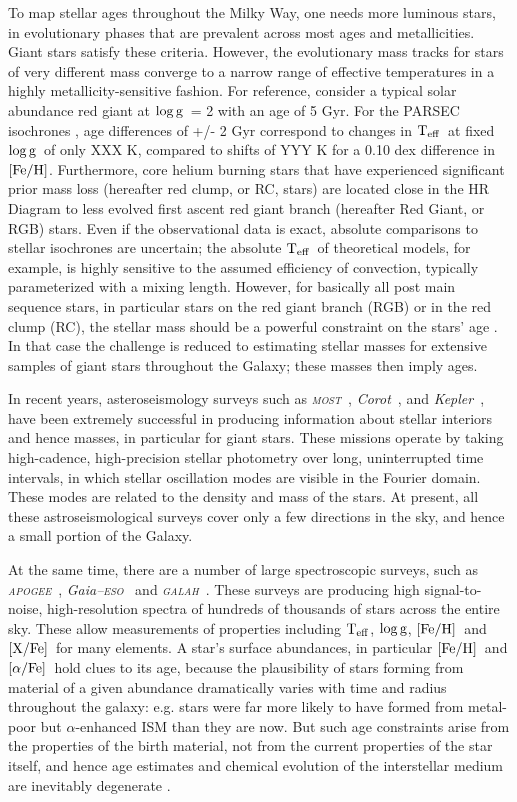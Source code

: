 \documentclass[12pt, preprint]{aastex}
\newcommand{\project}[1]{\textsl{#1}}
\newcommand{\apogee}{\project{\textsc{apogee}}}
\newcommand{\corot}{\project{Corot}}
\newcommand{\kepler}{\project{Kepler}}
\newcommand{\gaiaeso}{\project{Gaia--\textsc{eso}}}
\newcommand{\galah}{\project{\textsc{galah}}}
\newcommand{\most}{\project{\textsc{most}}}
\newcommand{\teff}{\mbox{$\rm T_{eff}$}}
\newcommand{\feh}{\mbox{$\rm [Fe/H]$}}
\newcommand{\xfe}{\mbox{$\rm [X/Fe]$}}
\newcommand{\alphafe}{\mbox{$\rm [\alpha/Fe]$}}
\newcommand{\logg}{\mbox{$\rm \log g$}}
\begin{document}
To map stellar ages throughout the Milky Way, one needs more luminous stars, in evolutionary phases that are prevalent across most ages and metallicities. Giant stars satisfy these criteria. However, the evolutionary mass tracks for stars of very different mass converge to a narrow range of effective temperatures in a highly metallicity-sensitive fashion.  For reference, consider a typical solar abundance red giant at \logg\ = 2 with an age of 5 Gyr.  For the PARSEC isochrones   \citep{Bressan2012}, age differences of +/- 2 Gyr correspond to changes in \teff\ at fixed \logg\ of only XXX K, compared to shifts of YYY K for a 0.10 dex difference in \feh.  Furthermore, core helium burning stars that have experienced significant prior mass loss (hereafter red clump, or RC, stars) are located close in the HR Diagram to less evolved first ascent red giant branch (hereafter Red Giant, or RGB) stars.  Even if the observational data is exact, absolute comparisons to stellar isochrones are uncertain; the absolute \teff\ of theoretical models, for example, is highly sensitive to the assumed efficiency of convection, typically parameterized with a mixing length.  However, for basically all post main sequence stars, in particular stars on the red giant branch (RGB) or in the red clump (RC), the stellar mass should be a powerful constraint on the stars' age \citep[see e.g.][]{Martig2014}. In that case the challenge is reduced to estimating stellar masses for extensive samples of giant stars throughout the Galaxy; these masses then imply ages.


In recent years, asteroseismology surveys such as \most\ \citep{most2005}, \corot\ \citep{corot2009}, and \kepler\ \citep{Bedding2010}, have
been extremely successful in producing information
about stellar interiors and hence masses, in particular for giant stars. 
These missions operate by taking high-cadence, high-precision stellar
photometry over long, uninterrupted time intervals, in which stellar oscillation 
modes are visible in the Fourier domain. These modes are related to the density and mass of the stars.
At present, all these astroseismological surveys cover only a few directions in the sky, and hence a small portion of the Galaxy.

At the same time, there are a number of large spectroscopic surveys, such
as \apogee\ \citep{Majewski2012}, \gaiaeso\ \citep{Gilmore2012} and \galah\ \citep{Freeman2012}. These surveys are 
producing high signal-to-noise, high-resolution spectra
of hundreds of thousands of stars across the entire sky. These allow measurements of properties including \teff, \logg, \feh\ and \xfe\ for many elements. A star's surface abundances, in particular \feh\ and \alphafe\ hold clues to its age, because the plausibility of stars forming from material of a given abundance dramatically varies with time and radius throughout the galaxy: e.g. stars 
were far more likely to have formed from metal-poor but $\alpha$-enhanced ISM than they are now. But such age constraints arise from the properties of the birth material, not from the current properties of the star itself, and hence age estimates and chemical evolution of the interstellar medium are inevitably degenerate \citep[see e.g.,][]{Schonrich2009, Ch2002}.
\end{document}
